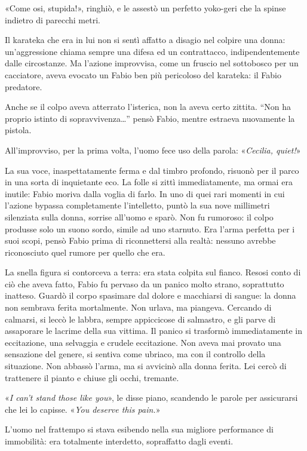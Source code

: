 «Come osi, stupida!», ringhiò, e le assestò un perfetto yoko-geri che la spinse indietro di parecchi metri.

Il karateka che era in lui non si sentì affatto a disagio nel colpire una donna: un'aggressione chiama sempre una difesa ed un contrattacco, indipendentemente dalle circostanze. Ma l'azione improvvisa, come un fruscio nel sottobosco per un cacciatore, aveva evocato un Fabio ben più pericoloso del karateka: il Fabio predatore.

Anche se il colpo aveva atterrato l'isterica, non la aveva certo zittita. ``Non ha proprio istinto di sopravvivenza\ldots'' pensò Fabio, mentre estraeva nuovamente la pistola.

All'improvviso, per la prima volta, l'uomo fece uso della parola: «\textit{Cecilia, quiet!}»

La sua voce, inaspettatamente ferma e dal timbro profondo, risuonò per il parco in una sorta di inquietante eco. La folle si zittì immediatamente, ma ormai era inutile: Fabio moriva dalla voglia di farlo. In uno di quei rari momenti in cui l'azione bypassa completamente l'intelletto, puntò la sua nove millimetri silenziata sulla donna, sorrise all'uomo e sparò. Non fu rumoroso: il colpo produsse solo un suono sordo, simile ad uno starnuto. Era l'arma perfetta per i suoi scopi, pensò Fabio prima di riconnettersi alla realtà: nessuno avrebbe riconosciuto quel rumore per quello che era.

La snella figura si contorceva a terra: era stata colpita sul fianco. Resosi conto di ciò che aveva fatto, Fabio fu pervaso da un panico molto strano, soprattutto inatteso. Guardò il corpo spasimare dal dolore e macchiarsi di sangue: la donna non sembrava ferita mortalmente. Non urlava, ma piangeva. Cercando di calmarsi, si leccò le labbra, sempre appiccicose di salmastro, e gli parve di assaporare le lacrime della sua vittima. Il panico si trasformò immediatamente in eccitazione, una selvaggia e crudele eccitazione. Non aveva mai provato una sensazione del genere, si sentiva come ubriaco, ma con il controllo della situazione. Non abbassò l'arma, ma si avvicinò alla donna ferita. Lei cercò di trattenere il pianto e chiuse gli occhi, tremante.

«\textit{I can't stand those like you}», le disse piano, scandendo le parole per assicurarsi che lei lo capisse. «\textit{You deserve this pain.}»

L'uomo nel frattempo si stava esibendo nella sua migliore performance di immobilità: era totalmente interdetto, sopraffatto dagli eventi.

